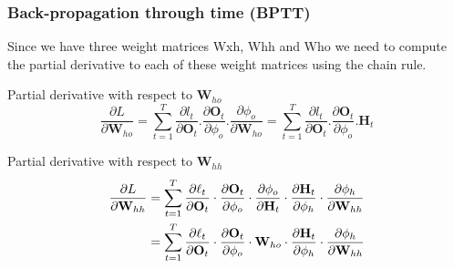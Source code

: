 \documentclass[
	11pt,
]{beamer}
\begin{document}
\begin{frame}
	\frametitle{Back-propagation through time (BPTT)}

		Since we have three weight matrices Wxh, Whh and Who we need to
compute the partial derivative to each of these weight matrices using the
chain rule.
		\smallskip
        \begin{block}{Partial derivative with respect to $\mathbf{W}_{ho}$}
        \begin{equation*}
            \frac{\partial L}{\partial \mathbf{W}_{ho}} = \sum_{t=1}^{T}\frac{\partial l_t}{\partial \mathbf{O}_t}.\frac{\partial \mathbf{O}_t}{\partial \phi_o}.\frac{\partial \phi_o}{\partial \mathbf{W}_{ho}} = \sum_{t=1}^{T}\frac{\partial l_t}{\partial \mathbf{O}_t}.\frac{\partial \mathbf{O}_t}{\partial \phi_o}.\mathbf{H}_t
        \end{equation*}
		\end{block}
	\begin{block}{Partial derivative with respect to $\mathbf{W}_{hh}$}
        \begin{equation*}
			\begin{split}
            \pdv{L}{\mathbf{W}_{hh}} &= \sum_{t=1}^T \pdv{\ell_t}{\mathbf{O}_t} \cdot \pdv{\mathbf{O}_t}{\phi_o} \cdot \pdv{\phi_o}{\mathbf{H}_t} \cdot \pdv{\mathbf{H}_t}{\phi_h} \cdot \pdv{\phi_h}{\mathbf{W}_{hh}} \\
									 &= \sum_{t=1}^T \pdv{\ell_t}{\mathbf{O}_t} \cdot \pdv{\mathbf{O}_t}{\phi_o} \cdot \mathbf{W}_{ho} \cdot \pdv{\mathbf{H}_t}{\phi_h} \cdot \pdv{\phi_h}{\mathbf{W}_{hh}} 
			\end{split}
        \end{equation*}
	\end{block}

\end{frame}
\end{document}
